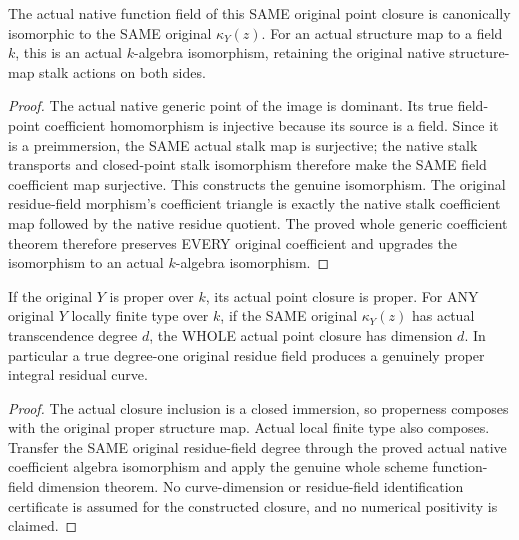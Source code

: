 \begin{definition}
\label{scheme:actual-point-closure-original-residue-field}
\leanok
{}
The actual native function field of this SAME original point closure is
canonically isomorphic to the SAME original $\kappa_Y(z)$. For an actual
structure map to a field $k$, this is an actual $k$-algebra isomorphism,
retaining the original native structure-map stalk actions on both sides.
\end{definition}
\begin{proof}
The actual native generic point of the image is dominant. Its true
field-point coefficient homomorphism is injective because its source is a
field. Since it is a preimmersion, the SAME actual stalk map is surjective;
the native stalk transports and closed-point stalk isomorphism therefore
make the SAME field coefficient map surjective. This constructs the genuine
isomorphism. The original residue-field morphism's coefficient triangle is
exactly the native stalk coefficient map followed by the native residue
quotient. The proved whole generic coefficient theorem therefore preserves
EVERY original coefficient and upgrades the isomorphism to an actual
$k$-algebra isomorphism.
\end{proof}

\begin{theorem}
\label{scheme:actual-point-closure-curve-dimension}
\leanok
{}
If the original $Y$ is proper over $k$, its actual point closure is proper.
For ANY original $Y$ locally finite type over $k$, if the SAME original
$\kappa_Y(z)$ has actual transcendence degree $d$, the WHOLE actual point
closure has dimension $d$. In particular a true degree-one original
residue field produces a genuinely proper integral residual curve.
\end{theorem}
\begin{proof}
The actual closure inclusion is a closed immersion, so properness composes
with the original proper structure map. Actual local finite type also
composes. Transfer the SAME original residue-field degree through the
proved actual native coefficient algebra isomorphism and apply the genuine
whole scheme function-field dimension theorem. No curve-dimension or
residue-field identification certificate is assumed for the constructed
closure, and no numerical positivity is claimed.
\end{proof}

